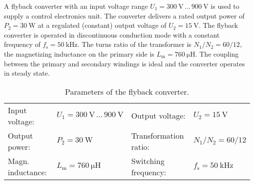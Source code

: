 

A flyback converter with an input voltage range $U_\mathrm{1} = \SI{300}{\volt} \, \dots \, \SI{900}{\volt}$ is used to supply a control electronics unit. The converter delivers a rated output power of  $P_\mathrm{2} = \SI{30}{\watt}$ at a regulated (constant) output voltage of  $U_\mathrm{2} = \SI{15}{\volt}$. The flyback converter is operated in discontinuous conduction  mode with a constant frequency of  $f_\mathrm{s} = \SI{50}{\kilo\hertz}$. The turns ratio of the transformer is $N_\mathrm{1}/N_\mathrm{2}=60/12$, the magnetizing inductance on the primary side is $L_\mathrm{m} = \SI{760}{\micro\henry}$. The coupling between the primary and secondary windings is ideal and the converter operates in steady state.



\begin{table}[ht]
    \centering  %
    \begin{tabular}{llll}
        \toprule
        
        Input voltage: &  $U_{\mathrm{1}} = \SI{300}{\volt} \, \dots \, \SI{900}{\volt}$ & Output voltage: & $U_{\mathrm{2}} = \SI{15}{\volt}$ \\ 
        Output power: & $P_2 = \SI{30}{\watt}$  & Transformation ratio: & $N_\mathrm{1}/N_\mathrm{2}=60/12$ \\ 
        Magn. inductance: & $L_\mathrm{m} = \SI{760}{\micro\henry}$ & Switching frequency: & $f_{\mathrm{s}} = \SI{50}{\kilo\hertz}$ \\ 
        \bottomrule
    \end{tabular}
    \caption{Parameters of the flyback converter.}  %
    \label{table:ex04_Parameters of the circuit}
\end{table}


